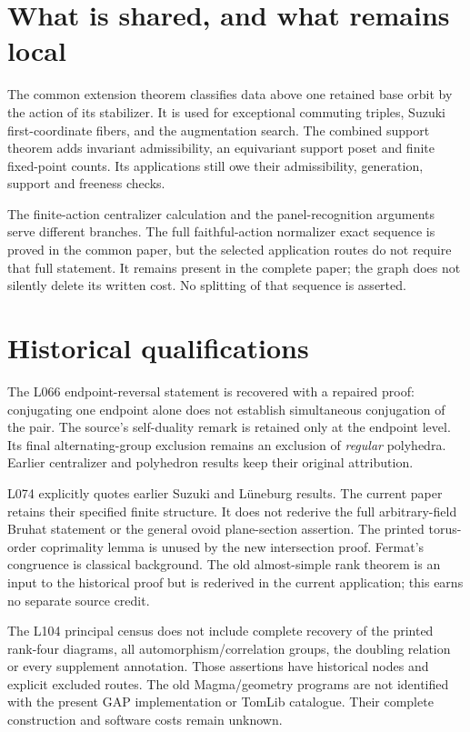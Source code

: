 \documentclass[a4paper,11pt]{article}
\begin{document}
\section*{What is shared, and what remains local}
The common extension theorem classifies data above one retained base orbit
by the action of its stabilizer. It is used for exceptional commuting
triples, Suzuki first-coordinate fibers, and the augmentation search.
The combined support theorem adds invariant admissibility, an equivariant
support poset and finite fixed-point counts. Its applications still owe
their admissibility, generation, support and freeness checks.

The finite-action centralizer calculation and the panel-recognition
arguments serve different branches. The full faithful-action normalizer
exact sequence is proved in the common paper, but the selected application
routes do not require that full statement. It remains present in the
complete paper; the graph does not silently delete its written cost.
No splitting of that sequence is asserted.

\section*{Historical qualifications}
The L066 endpoint-reversal statement is recovered with a repaired proof:
conjugating one endpoint alone does not establish simultaneous
conjugation of the pair. The source's self-duality remark is retained only
at the endpoint level. Its final alternating-group exclusion remains an
exclusion of \emph{regular} polyhedra. Earlier centralizer and polyhedron
results keep their original attribution.

L074 explicitly quotes earlier Suzuki and Lüneburg results. The current
paper retains their specified finite structure. It does not rederive the
full arbitrary-field Bruhat statement or the general ovoid plane-section
assertion. The printed torus-order coprimality lemma is unused by the new
intersection proof. Fermat's congruence is classical background. The old
almost-simple rank theorem is an input to the historical proof but is
rederived in the current application; this earns no separate source credit.

The L104 principal census does not include complete recovery of the printed
rank-four diagrams, all automorphism/correlation groups, the doubling
relation or every supplement annotation. Those assertions have historical
nodes and explicit excluded routes. The old Magma/geometry programs are
not identified with the present GAP implementation or TomLib catalogue.
Their complete construction and software costs remain unknown.
\end{document}
